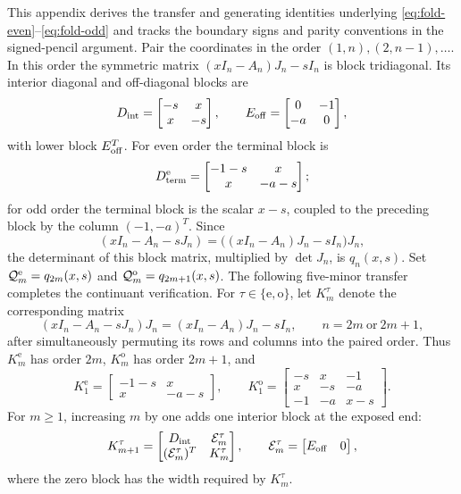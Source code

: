 \documentclass[10pt,twoside]{siamart1116}
\numberwithin{equation}{section}
\begin{document}
This appendix derives the transfer and generating identities underlying
\eqref{eq:fold-even}--\eqref{eq:fold-odd} and tracks the boundary signs and
parity conventions in the signed-pencil argument.
Pair the coordinates in the order
\((1,n),(2,n-1),\ldots\).  In this order the symmetric matrix
\((xI_n-A_n)J_n-sI_n\) is block tridiagonal.  Its interior diagonal and
off-diagonal blocks are
\[
 D_{\rm int}=\begin{bmatrix}-s&x\\x&-s\end{bmatrix},
 \qquad
 E_{\rm off}=\begin{bmatrix}0&-1\\-a&0\end{bmatrix},
\]
with lower block \(E_{\rm off}^T\).  For even order the terminal block is
\[
 D_{\rm term}^{\rm e}=\begin{bmatrix}-1-s&x\\x&-a-s\end{bmatrix};
\]
for odd order the terminal block is the scalar \(x-s\), coupled to the
preceding block by the column \((-1,-a)^T\).  Since
\[
 (xI_n-A_n-sJ_n)=\bigl((xI_n-A_n)J_n-sI_n\bigr)J_n,
\]
the determinant of this block matrix, multiplied by \(\det J_n\), is
\(q_n(x,s)\).  Set \(\mathcal Q_m^{\rm e}=q_{2m}(x,s)\) and
\(\mathcal Q_m^{\rm o}=q_{2m+1}(x,s)\).  The following five-minor transfer
completes the continuant verification.
For \(\tau\in\{\mathrm e,\mathrm o\}\), let \(K_m^\tau\) denote the
corresponding matrix
\[
 (xI_n-A_n-sJ_n)J_n=(xI_n-A_n)J_n-sI_n,
 \qquad n=2m\ \text{or}\ 2m+1,
\]
after simultaneously permuting its rows and columns into the paired
order.  Thus \(K_m^{\mathrm e}\) has order \(2m\),
\(K_m^{\mathrm o}\) has order \(2m+1\), and
\[
 K_1^{\mathrm e}=
 \begin{bmatrix}-1-s&x\\x&-a-s\end{bmatrix},
 \qquad
 K_1^{\mathrm o}=
 \begin{bmatrix}
 -s&x&-1\\
 x&-s&-a\\
 -1&-a&x-s
 \end{bmatrix}.
\]
For \(m\geq1\), increasing \(m\) by one adds one interior block at the
exposed end:
\begin{equation}\label{eq:fold-block-extension}
 K_{m+1}^\tau=
 \begin{bmatrix}
  D_{\rm int}&\mathcal E_m^\tau\\
  (\mathcal E_m^\tau)^T&K_m^\tau
 \end{bmatrix},
 \qquad
 \mathcal E_m^\tau=
 \begin{bmatrix}E_{\rm off}&0\end{bmatrix},
\end{equation}
where the zero block has the width required by \(K_m^\tau\).
\end{document}
